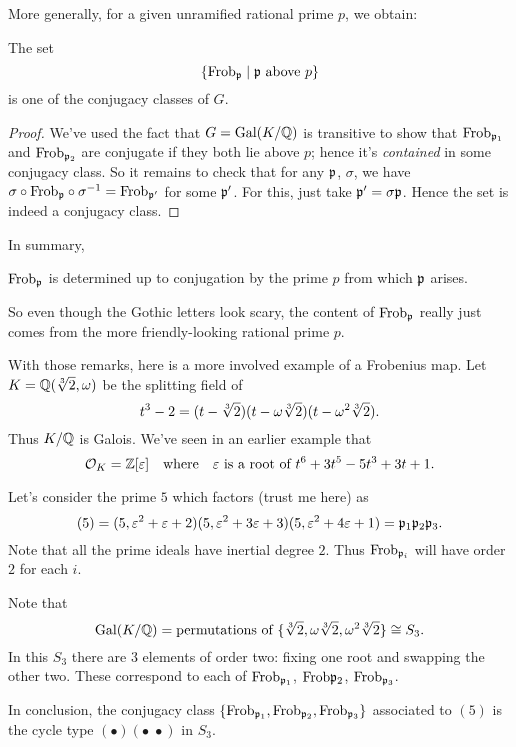 More generally, for a given unramified rational prime $p$, we obtain:
\begin{theorem}
	The set
	\[ \left\{ \mathrm{Frob}_\mathfrak p \mid \mathfrak p \text{ above } p \right\} \]
	is one of the conjugacy classes of $G$.
\end{theorem}
\begin{proof}
	We've used the fact that $G = \operatorname{Gal}(K/\mathbb Q)$ is transitive
	to show that $\mathrm{Frob}_{\mathfrak p_1}$ and $\mathrm{Frob}_{\mathfrak p_2}$ are conjugate
	if they both lie above $p$; hence it's \emph{contained} in some
	conjugacy class.
	So it remains to check that for any $\mathfrak p$, $\sigma$,
	we have $\sigma \circ \mathrm{Frob}_\mathfrak p \circ \sigma^{-1} = \mathrm{Frob}_{\mathfrak p'}$
	for some $\mathfrak p'$. For this, just take $\mathfrak p' = \sigma\mathfrak p$.
	Hence the set is indeed a conjugacy class.
\end{proof}

In summary,
\begin{moral}
	$\mathrm{Frob}_{\mathfrak p}$ is determined up to conjugation by the prime $p$
	from which $\mathfrak p$ arises.
\end{moral}
So even though the Gothic letters look scary, the content of $\mathrm{Frob}_{\mathfrak p}$
really just comes from the more friendly-looking rational prime $p$.


\begin{example}
	With those remarks, here is a more involved example of a Frobenius map.
	Let $K = \mathbb Q(\sqrt[3]{2}, \omega)$ be the splitting field of
	\[ t^3-2 = (t-\sqrt[3]{2})(t-\omega\sqrt[3]{2})(t-\omega^2\sqrt[3]{2}). \]
	Thus $K/\mathbb Q$ is Galois.
	We've seen in an earlier example that
	\[ \mathcal O_K = \mathbb Z[\varepsilon] \quad\text{where}\quad \varepsilon \text { is a root of } t^6+3t^5-5t^3+3t+1. \]

	Let's consider the prime $5$ which factors (trust me here) as
	\[ (5) = (5, \varepsilon^2+\varepsilon+2)(5, \varepsilon^2+3\varepsilon+3)(5, \varepsilon^2+4\varepsilon+1)
		= \mathfrak p_1 \mathfrak p_2 \mathfrak p_3. \]
	Note that all the prime ideals have inertial degree $2$.
	Thus $\mathrm{Frob}_{\mathfrak p_i}$ will have order $2$ for each $i$.

	Note that
	\[ \operatorname{Gal}(K/\mathbb Q) =
		\text{permutations of } \{\sqrt[3]{2},\omega\sqrt[3]{2},\omega^2\sqrt[3]{2}\}
		\cong S_3.  \]
	In this $S_3$ there are $3$ elements of order two:
	fixing one root and swapping the other two.
	These correspond to each of $\mathrm{Frob}_{\mathfrak p_1}$, $\mathrm{Frob}{\mathfrak p_2}$, $\mathrm{Frob}_{\mathfrak p_3}$.

	In conclusion, the conjugacy class
	$\left\{ \mathrm{Frob}_{\mathfrak p_1}, \mathrm{Frob}_{\mathfrak p_2}, \mathrm{Frob}_{\mathfrak p_3} \right\}$
	associated to $(5)$ is the
	cycle type $(\bullet)(\bullet \; \bullet)$ in $S_3$.
\end{example}


